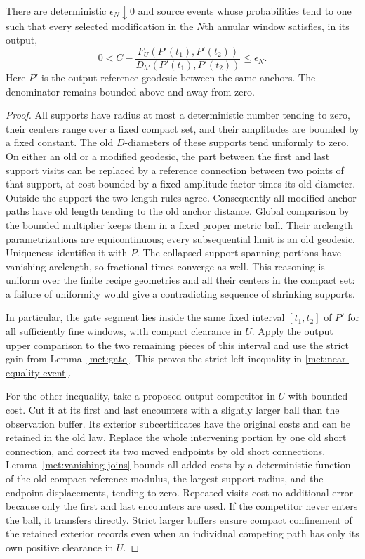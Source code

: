 \begin{lemma}
\label{met:near-equality}
There are deterministic $\epsilon_N\downarrow0$ and source events
whose probabilities tend to one such that every selected
modification in the $N$th annular window satisfies, in its output,
\begin{equation}
 0<C-
 \frac{F_U(P'(t_1),P'(t_2))}
      {D_{h'}(P'(t_1),P'(t_2))}
 \leq\epsilon_N.
 \label{met:near-equality-event}
\end{equation}
Here $P'$ is the output reference geodesic between the same anchors.
The denominator remains bounded above and away from zero.
\end{lemma}

\begin{proof}
All supports have radius at most a deterministic number tending to
zero, their centers range over a fixed compact set, and their
amplitudes are bounded by a fixed constant.  The old $D$-diameters of
these supports tend uniformly to zero.  On either an old or a
modified geodesic, the part between the first and last support visits
can be replaced by a reference connection between two points of that
support, at cost bounded by a fixed amplitude factor times its old
diameter.  Outside the support the two length rules agree.
Consequently all modified anchor paths have old length tending to the
old anchor distance.  Global comparison by the bounded multiplier
keeps them in a fixed proper metric ball.  Their arclength
parametrizations are equicontinuous; every subsequential limit is an
old geodesic.  Uniqueness identifies it with $P$.  The collapsed
support-spanning portions have vanishing arclength, so fractional
times converge as well.  This reasoning is uniform over the finite
recipe geometries and all their centers in the compact set: a
failure of uniformity would give a contradicting sequence of
shrinking supports.

In particular, the gate segment lies inside the same fixed interval
$[t_1,t_2]$ of $P'$ for all sufficiently fine windows, with compact
clearance in $U$.  Apply the output upper comparison to the two
remaining pieces of this interval and use the strict gain from
Lemma~\ref{met:gate}.  This proves the strict left inequality in
\eqref{met:near-equality-event}.

For the other inequality, take a proposed output competitor in $U$
with bounded cost.  Cut it at its first and last encounters with a
slightly larger ball than the observation buffer.  Its exterior
subcertificates have the original costs and can be retained in the
old law.  Replace the whole intervening portion by one old short
connection, and correct its two moved endpoints by old short
connections.  Lemma~\ref{met:vanishing-joins} bounds all added costs
by a deterministic function of the old compact reference modulus,
the largest support radius, and the endpoint displacements, tending
to zero.  Repeated visits cost no additional error because only the
first and last encounters are used.  If the competitor never enters
the ball, it transfers directly.  Strict larger buffers ensure
compact confinement of the retained exterior records even when an
individual competing path has only its own positive clearance in
$U$.


\end{proof}
